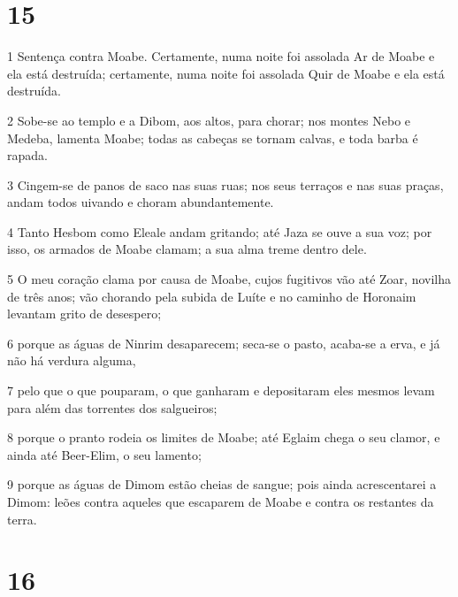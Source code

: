 \chapter{15}

\par 1 Sentença contra Moabe. Certamente, numa noite foi assolada Ar de Moabe e ela está destruída; certamente, numa noite foi assolada Quir de Moabe e ela está destruída.
\par 2 Sobe-se ao templo e a Dibom, aos altos, para chorar; nos montes Nebo e Medeba, lamenta Moabe; todas as cabeças se tornam calvas, e toda barba é rapada.
\par 3 Cingem-se de panos de saco nas suas ruas; nos seus terraços e nas suas praças, andam todos uivando e choram abundantemente.
\par 4 Tanto Hesbom como Eleale andam gritando; até Jaza se ouve a sua voz; por isso, os armados de Moabe clamam; a sua alma treme dentro dele.
\par 5 O meu coração clama por causa de Moabe, cujos fugitivos vão até Zoar, novilha de três anos; vão chorando pela subida de Luíte e no caminho de Horonaim levantam grito de desespero;
\par 6 porque as águas de Ninrim desaparecem; seca-se o pasto, acaba-se a erva, e já não há verdura alguma,
\par 7 pelo que o que pouparam, o que ganharam e depositaram eles mesmos levam para além das torrentes dos salgueiros;
\par 8 porque o pranto rodeia os limites de Moabe; até Eglaim chega o seu clamor, e ainda até Beer-Elim, o seu lamento;
\par 9 porque as águas de Dimom estão cheias de sangue; pois ainda acrescentarei a Dimom: leões contra aqueles que escaparem de Moabe e contra os restantes da terra.

\chapter{16}

